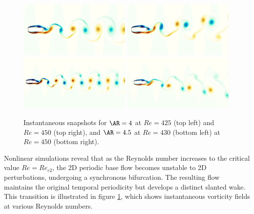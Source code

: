 \begin{figure}
  \centering
  \includegraphics[trim={0 100 0 100},clip,width=0.49\textwidth]{./fig/vort_Re425_25.png}
  \includegraphics[trim={0 100 0 100},clip,width=0.49\textwidth]{./fig/vort_Re450_25.png}  
  \includegraphics[trim={0 100 0 100},clip,width=0.49\textwidth]{./fig/AR4p5/vort_Re430_25.png}
  \includegraphics[trim={0 100 0 100},clip,width=0.49\textwidth]{./fig/AR4p5/vort_Re450_25.png}
  \caption{Instantaneous snapshots for $\AR=4$ at $Re=425$ (top left) and $Re=450$ (top right), and $\AR=4.5$ at $Re=430$ (bottom left) at $Re=450$ (bottom right).}
  \label{fig:snap_ar4_ar4p5}
\end{figure}

Nonlinear simulations reveal that as the Reynolds number increases to the critical value $Re = Re_{c2}$, the 2D periodic base flow becomes unstable to 2D perturbations, undergoing a synchronous bifurcation. The resulting flow maintains the original temporal periodicity but develops a distinct slanted wake. This transition is illustrated in figure \ref{fig:snap_ar4_ar4p5}, which shows instantaneous vorticity fields at various Reynolds numbers.

